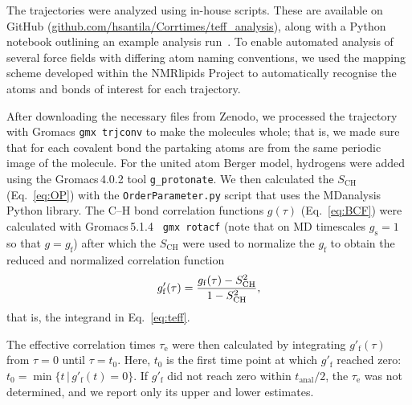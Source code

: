 \documentclass[journal=jcisd8,manuscript=article,layout=twocolumn]{achemso}
\begin{document}
The trajectories were analyzed using in-house scripts. These are available on GitHub (\url{github.com/hsantila/Corrtimes/teff_analysis}), along with a Python notebook outlining an example analysis run~\cite{githubsnap}.  To enable automated analysis of several force fields with differing atom naming conventions, we used the mapping scheme developed within the NMR\-lipids Project to automatically recognise the atoms and bonds of interest for each  trajectory.

After downloading the necessary files from Zenodo, we processed the trajectory with Gromacs \texttt{gmx trjconv} to make the molecules whole; that is, we made sure that for each covalent bond the partaking atoms are from the same periodic image of the molecule.
For the united atom Berger model, hydrogens were added using the Gromacs\,4.0.2 tool \texttt{g\_protonate}.
We then calculated the  $S_\mathrm{CH}$ (Eq.~\eqref{eq:OP}) with the \texttt{OrderParameter.py} script that uses the MDanalysis\cite{agrawal11,gowers16} Python library.
%
The \mbox{C--H} bond correlation functions
$g(\tau)$ (Eq.~\eqref{eq:BCF})
were calculated with Gromacs\,5.1.4~\cite{abraham2015gromacs} \texttt{gmx rotacf}
(note that on MD timescales \mbox{$g_\mathrm s =1$} so that $g = g_\mathrm{f}$)
after which the $S_\mathrm{CH}$ were used to
normalize the $g_\mathrm f$ to obtain %
the reduced and normalized correlation function
\begin{equation}
\label{eq:nBCF}
g'_{\mathrm{f}}(\tau)=\frac{g_{\mathrm{f}}(\tau)-S^{2}_{\rm{CH}}}{1-S^2_{\mathrm{CH}}},
\end{equation}
that is, the integrand in Eq.~\eqref{eq:teff}. 

The effective correlation times $\tau_\mathrm e$ were then calculated by integrating $g'_\mathrm f(\tau)$
from $\tau=0$ until $\tau = t_0$.
Here, $t_\mathrm 0$ is the first time point at which $g'_\mathrm f$ reached zero: $t_0 = \min
	\{
	t\,|\,g'_\mathrm f(t)=0
	\}
$.
%
If $g'_\mathrm f$ did not reach zero within 
$t_\mathrm{anal}/2$, the 
$\tau_\mathrm e$ was not determined,
and we report only its upper and lower estimates.
\end{document}
